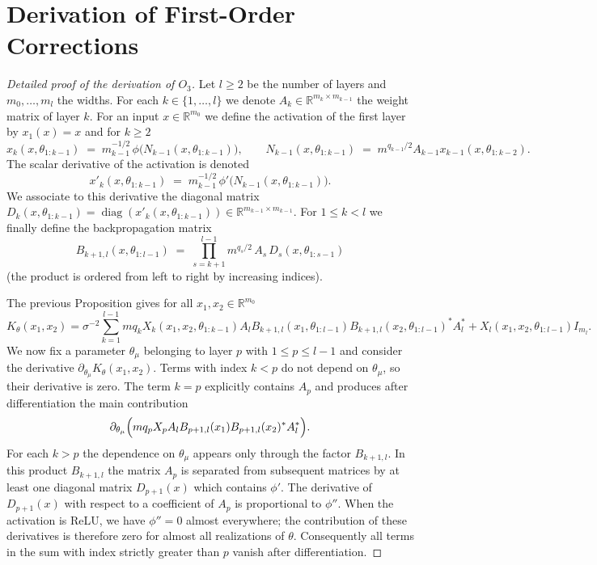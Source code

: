 \documentclass{article}
\newtheorem{proof}{Proof}
\begin{document}
\section{Derivation of First-Order Corrections}

\begin{proof}[Detailed proof of the derivation of $O_3$]
Let $l \ge 2$ be the number of layers and $m_0,\dots ,m_l$ the widths. For each $k\in\{1,\dots ,l\}$ we denote $A_k\in \mathbb R^{m_k\times m_{k-1}}$ the weight matrix of layer $k$. For an input $x\in\mathbb R^{m_0}$ we define the activation of the first layer by $x_1(x)=x$ and for $k\ge 2$
\[
 x_k(x,\theta_{1:k-1})\;=\;m_{k-1}^{-1/2}\,\phi\bigl(N_{k-1}(x,\theta_{1:k-1})\bigr),\qquad N_{k-1}(x,\theta_{1:k-1})\;=\;m^{q_{k-1}/2}A_{k-1}x_{k-1}(x,\theta_{1:k-2}).
\]
The scalar derivative of the activation is denoted
\[
 x'_k(x,\theta_{1:k-1})\;=\;m_{k-1}^{-1/2}\,\phi'\bigl(N_{k-1}(x,\theta_{1:k-1})\bigr).
\]
We associate to this derivative the diagonal matrix $D_k(x,\theta_{1:k-1})=\operatorname{diag}(x'_k(x,\theta_{1:k-1}))\in \mathbb R^{m_{k-1}\times m_{k-1}}$. For $1\le k<l$ we finally define the backpropagation matrix
\[
 B_{k+1,l}(x,\theta_{1:l-1})\;=\;\prod_{s=k+1}^{l-1} m^{q_s/2}\,A_s\,D_{s}(x,\theta_{1:s-1})
\]
(the product is ordered from left to right by increasing indices).

The previous Proposition gives for all $x_1,x_2\in\mathbb R^{m_0}$
\[
 K_{\theta}(x_1,x_2)=\sigma^{-2}\sum_{k=1}^{l-1}m q_k X_k(x_1,x_2,\theta_{1:k-1})A_l B_{k+1,l}(x_1,\theta_{1:l-1})B_{k+1,l}(x_2,\theta_{1:l-1})^{*}A_l^{*}+X_l(x_1,x_2,\theta_{1:l-1})I_{m_l}.
\]
We now fix a parameter $\theta_{\mu}$ belonging to layer $p$ with $1\le p\le l-1$ and consider the derivative $\partial_{\theta_{\mu}}K_{\theta}(x_1,x_2)$. Terms with index $k<p$ do not depend on $\theta_{\mu}$, so their derivative is zero. The term $k=p$ explicitly contains $A_p$ and produces after differentiation the main contribution
\[
 \partial_{\theta_{\mu}}\Bigl(m q_p X_p A_l B_{p+1,l}(x_1)B_{p+1,l}(x_2)^{*}A_l^{*}\Bigr).
\]
For each $k>p$ the dependence on $\theta_{\mu}$ appears only through the factor $B_{k+1,l}$. In this product $B_{k+1,l}$ the matrix $A_p$ is separated from subsequent matrices by at least one diagonal matrix $D_{p+1}(x)$ which contains $\phi'$. The derivative of $D_{p+1}(x)$ with respect to a coefficient of $A_p$ is proportional to $\phi''$. When the activation is ReLU, we have $\phi''=0$ almost everywhere; the contribution of these derivatives is therefore zero for almost all realizations of $\theta$. Consequently all terms in the sum with index strictly greater than $p$ vanish after differentiation.


\end{proof}
\end{document}
